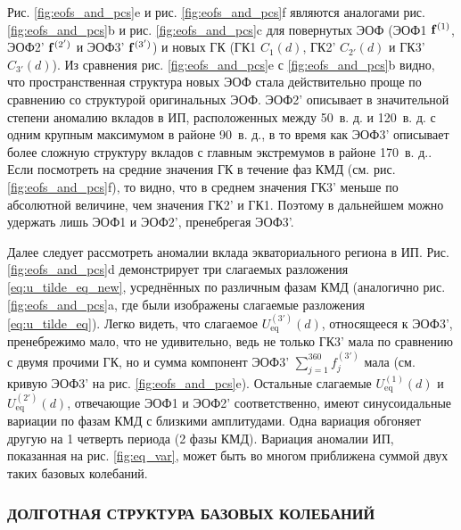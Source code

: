 Рис. \ref{fig:eofs_and_pcs}{e} и рис. \ref{fig:eofs_and_pcs}{f} являются аналогами рис. \ref{fig:eofs_and_pcs}{b} и рис. \ref{fig:eofs_and_pcs}{c} для повернутых ЭОФ (ЭОФ1 $\vb{f}^{(1)}$, ЭОФ2' $\vb{f}^{(2')}$ и ЭОФ3' $\vb{f}^{(3')}$) и новых ГК (ГК1 $C_1(d)$, ГК2' $C_{2'}(d)$ и ГК3' $C_{3'}(d)$). Из сравнения рис. \ref{fig:eofs_and_pcs}{e}  с \ref{fig:eofs_and_pcs}{b} видно, что пространственная структура новых ЭОФ стала действительно проще по сравнению со структурой оригинальных ЭОФ. ЭОФ2' описывает в значительной степени аномалию вкладов в ИП, расположенных между 50\textdegree\ в. д. и 120\textdegree\ в. д. с одним крупным максимумом в районе 90\textdegree\ в. д., в то время как ЭОФ3' описывает более сложную структуру вкладов с главным экстремумов в районе 170\textdegree\ в. д.. Если посмотреть на средние значения ГК в течение фаз КМД (см. рис. \ref{fig:eofs_and_pcs}{f}), то видно, что в среднем значения ГК3' меньше по абсолютной величине, чем значения ГК2' и ГК1. Поэтому в дальнейшем можно удержать лишь ЭОФ1 и ЭОФ2', пренебрегая ЭОФ3'.

Далее следует рассмотреть аномалии вклада экваториального региона в ИП. Рис. \ref{fig:eofs_and_pcs}{d} демонстрирует три слагаемых разложения \eqref{eq:u_tilde_eq_new}, усреднённых по различным фазам КМД (аналогично рис. \ref{fig:eofs_and_pcs}{a}, где были изображены слагаемые разложения \eqref{eq:u_tilde_eq}). Легко видеть, что слагаемое $U_\mathrm{eq}^{(3')} (d)$, относящееся к ЭОФ3', пренебрежимо мало, что не удивительно, ведь не только ГК3' мала по сравнению с двумя прочими ГК, но и сумма компонент ЭОФ3' $\sum_{j=1}^{360} {f}_j^{(3')}$ мала (см. кривую ЭОФ3' на рис. \ref{fig:eofs_and_pcs}{e}). Остальные слагаемые $U_\mathrm{eq}^{(1)} (d)$ и $U_\mathrm{eq}^{(2')} (d)$, отвечающие ЭОФ1 и ЭОФ2' соответственно, имеют синусоидальные вариации по фазам КМД с близкими амплитудами. Одна вариация обгоняет другую на 1 четверть периода (2 фазы КМД). Вариация аномалии ИП, показанная на рис. \ref{fig:eq_var}, может быть во многом приближена суммой двух таких базовых колебаний.

\subsubsection{ДОЛГОТНАЯ СТРУКТУРА БАЗОВЫХ КОЛЕБАНИЙ}

